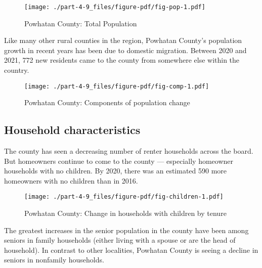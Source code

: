 \documentclass[
  letterpaper,
  DIV=11,
  numbers=noendperiod]{scrreprt}
\begin{document}
\begin{figure}

{\centering \texttt{[image: ./part-4-9\_files/figure-pdf/fig-pop-1.pdf]}

}

\caption{\label{fig-pop}Powhatan County: Total Population}

\end{figure}

Like many other rural counties in the region, Powhatan County's
population growth in recent years has been due to domestic migration.
Between 2020 and 2021, 772 new residents came to the county from
somewhere else within the country.

\begin{figure}

{\centering \texttt{[image: ./part-4-9\_files/figure-pdf/fig-comp-1.pdf]}

}

\caption{\label{fig-comp}Powhatan County: Components of population
change}

\end{figure}

\hypertarget{household-characteristics-8}{%
\subsection{Household
characteristics}\label{household-characteristics-8}}

The county has seen a decreasing number of renter households across the
board. But homeowners continue to come to the county --- especially
homeowner households with no children. By 2020, there was an estimated
590 more homeowners with no children than in 2016.

\begin{figure}

{\centering \texttt{[image: ./part-4-9\_files/figure-pdf/fig-children-1.pdf]}

}

\caption{\label{fig-children}Powhatan County: Change in households with
children by tenure}

\end{figure}

The greatest increases in the senior population in the county have been
among seniors in family households (either living with a spouse or are
the head of household). In contrast to other localities, Powhatan County
is seeing a decline in seniors in nonfamily households.
\end{document}
